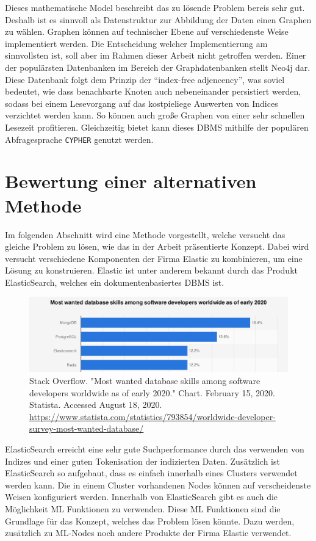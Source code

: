 \documentclass[
	12pt,
	BCOR=5mm,
	DIV=12,
	headinclude=on,
	footinclude=off,
	parskip=half,
	bibliography=totoc,
	listof=entryprefix,
	toc=listof,
	numbers=noenddot,
	plainfootsepline
]{scrreprt}
\begin{document}
Dieses mathematische Model beschreibt das zu lösende Problem bereis sehr gut. Deshalb ist es sinnvoll als Datenstruktur zur Abbildung der Daten einen Graphen zu wählen. Graphen können auf technischer Ebene auf verschiedenste Weise implementiert werden. Die Entscheidung welcher Implementierung am sinnvollsten ist, soll aber im Rahmen dieser Arbeit nicht getroffen werden. Einer der populärsten Datenbanken im Bereich der Graphdatenbanken stellt Neo4j dar. Diese Datenbank folgt dem Prinzip der \enquote{index-free adjencency}, was soviel bedeutet, wie dass benachbarte Knoten auch nebeneinander persistiert werden, sodass bei einem Lesevorgang auf das kostpieliege Auswerten von Indices verzichtet werden kann. So können auch große Graphen von einer sehr schnellen Lesezeit profitieren. Gleichzeitig bietet kann dieses \ac{DBMS} mithilfe der populären Abfragesprache \texttt{CYPHER} genutzt werden.

\section{Bewertung einer alternativen Methode}

Im folgenden Abschnitt wird eine Methode vorgestellt, welche versucht das gleiche Problem zu lösen, wie das in der Arbeit präsentierte Konzept. Dabei wird versucht verschiedene Komponenten der Firma Elastic zu kombinieren, um eine Lösung zu konstruieren. Elastic ist unter anderem bekannt durch das Produkt ElasticSearch, welches ein dokumentenbasiertes \ac{DBMS} ist.

\begin{figure}[h]
	\centering
	\includegraphics[width=1.0\linewidth]{img/statista_db.png}
	\caption{Stack Overflow. "Most wanted database skills among software developers worldwide as of early 2020." Chart. February 15, 2020. Statista. Accessed August 18, 2020. \url{https://www.statista.com/statistics/793854/worldwide-developer-survey-most-wanted-database/}}
\end{figure}

ElasticSearch erreicht eine sehr gute Suchperformance durch das verwenden von Indizes und einer guten Tokenisation der indizierten Daten. Zusätzlich ist ElasticSearch so aufgebaut, dass es einfach innerhalb eines Clusters verwendet werden kann. Die in einem Cluster vorhandenen Nodes können auf verscheidenste Weisen konfiguriert werden. Innerhalb von ElasticSearch gibt es auch die Möglichkeit \ac{ML} Funktionen zu verwenden. Diese \ac{ML} Funktionen sind die Grundlage für das Konzept, welches das Problem lösen könnte. Dazu werden, zusätzlich zu \ac{ML}-Nodes noch andere Produkte der Firma Elastic verwendet.
\end{document}
